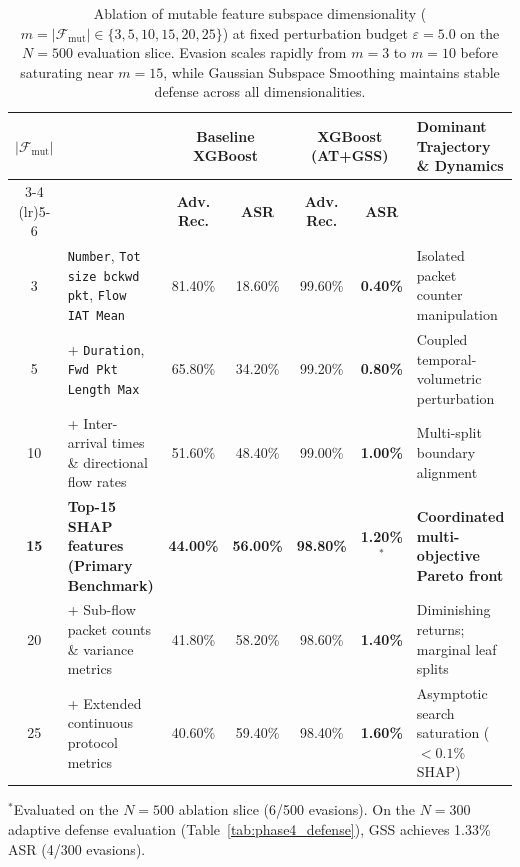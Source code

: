 \documentclass[iicol,pdflatex,sn-mathphys-num]{sn-jnl}
\begin{document}
\begin{table}[htbp]
\centering
\footnotesize
\setlength{\tabcolsep}{3pt}
\caption{Ablation of mutable feature subspace dimensionality ($m = |\mathcal{F}_{\text{mut}}| \in \{3, 5, 10, 15, 20, 25\}$) at fixed perturbation budget $\varepsilon = 5.0$ on the $N=500$ evaluation slice. Evasion scales rapidly from $m=3$ to $m=10$ before saturating near $m=15$, while Gaussian Subspace Smoothing maintains stable defense across all dimensionalities.}
\label{tab:feature_count_ablation}
\begin{tabularx}{\textwidth}{c >{\raggedright\arraybackslash}p{4.2cm} cccc >{\raggedright\arraybackslash}X}
\toprule
\multirow{2}{*}{\textbf{$|\mathcal{F}_{\text{mut}}|$}} & \multirow{2}{*}{\textbf{Primary Constituent Features}} & \multicolumn{2}{c}{\textbf{Baseline XGBoost}} & \multicolumn{2}{c}{\textbf{XGBoost (AT+GSS)}} & \multirow{2}{*}{\textbf{Dominant Trajectory \& Dynamics}} \\
\cmidrule(lr){3-4} \cmidrule(lr){5-6}
& & \textbf{Adv. Rec.} & \textbf{ASR} & \textbf{Adv. Rec.} & \textbf{ASR} & \\
\midrule
3  & \texttt{Number}, \texttt{Tot size bckwd pkt}, \texttt{Flow IAT Mean} & 81.40\% & 18.60\% & 99.60\% & \textbf{0.40\%} & Isolated packet counter manipulation \\
5  & + \texttt{Duration}, \texttt{Fwd Pkt Length Max} & 65.80\% & 34.20\% & 99.20\% & \textbf{0.80\%} & Coupled temporal-volumetric perturbation \\
10 & + Inter-arrival times \& directional flow rates & 51.60\% & 48.40\% & 99.00\% & \textbf{1.00\%} & Multi-split boundary alignment \\
\textbf{15} & \textbf{Top-15 SHAP features (Primary Benchmark)} & \textbf{44.00\%} & \textbf{56.00\%} & \textbf{98.80\%} & \textbf{1.20\%$^{*}$} & \textbf{Coordinated multi-objective Pareto front} \\
20 & + Sub-flow packet counts \& variance metrics & 41.80\% & 58.20\% & 98.60\% & \textbf{1.40\%} & Diminishing returns; marginal leaf splits \\
25 & + Extended continuous protocol metrics & 40.60\% & 59.40\% & 98.40\% & \textbf{1.60\%} & Asymptotic search saturation ($<0.1\%$ SHAP) \\
\bottomrule
\end{tabularx}
\vspace{2pt}\par\raggedright\footnotesize $^{*}$Evaluated on the $N=500$ ablation slice (6/500 evasions). On the $N=300$ adaptive defense evaluation (Table~\ref{tab:phase4_defense}), GSS achieves 1.33\% ASR (4/300 evasions).
\end{table}
\end{document}
